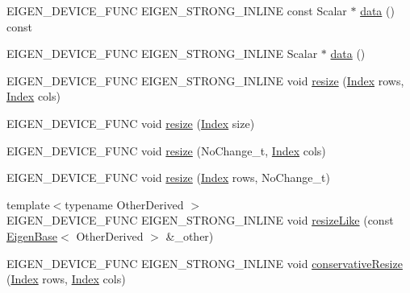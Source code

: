 \begin{DoxyCompactItemize}
\item 
E\+I\+G\+E\+N\+\_\+\+D\+E\+V\+I\+C\+E\+\_\+\+F\+U\+NC E\+I\+G\+E\+N\+\_\+\+S\+T\+R\+O\+N\+G\+\_\+\+I\+N\+L\+I\+NE const Scalar $\ast$ \hyperlink{class_eigen_1_1_plain_object_base_ac25699535374b1854cf8494e44ad31b2}{data} () const
\item 
E\+I\+G\+E\+N\+\_\+\+D\+E\+V\+I\+C\+E\+\_\+\+F\+U\+NC E\+I\+G\+E\+N\+\_\+\+S\+T\+R\+O\+N\+G\+\_\+\+I\+N\+L\+I\+NE Scalar $\ast$ \hyperlink{class_eigen_1_1_plain_object_base_a54ed64f45b2f5e852355d5e2311810bd}{data} ()
\item 
E\+I\+G\+E\+N\+\_\+\+D\+E\+V\+I\+C\+E\+\_\+\+F\+U\+NC E\+I\+G\+E\+N\+\_\+\+S\+T\+R\+O\+N\+G\+\_\+\+I\+N\+L\+I\+NE void \hyperlink{class_eigen_1_1_plain_object_base_a99d9054ee2d5a40c6e00ded0265e9cea}{resize} (\hyperlink{namespace_eigen_a62e77e0933482dafde8fe197d9a2cfde}{Index} rows, \hyperlink{namespace_eigen_a62e77e0933482dafde8fe197d9a2cfde}{Index} cols)
\item 
E\+I\+G\+E\+N\+\_\+\+D\+E\+V\+I\+C\+E\+\_\+\+F\+U\+NC void \hyperlink{class_eigen_1_1_plain_object_base_abf8a9ec07cd52a2cdabb527596f7ddd1}{resize} (\hyperlink{namespace_eigen_a62e77e0933482dafde8fe197d9a2cfde}{Index} size)
\item 
E\+I\+G\+E\+N\+\_\+\+D\+E\+V\+I\+C\+E\+\_\+\+F\+U\+NC void \hyperlink{class_eigen_1_1_plain_object_base_ab71a655f73d05a0e389e3ed13b6fe5f3}{resize} (No\+Change\+\_\+t, \hyperlink{namespace_eigen_a62e77e0933482dafde8fe197d9a2cfde}{Index} cols)
\item 
E\+I\+G\+E\+N\+\_\+\+D\+E\+V\+I\+C\+E\+\_\+\+F\+U\+NC void \hyperlink{class_eigen_1_1_plain_object_base_a7b44761b7350ae3756035bbf7d7c04f6}{resize} (\hyperlink{namespace_eigen_a62e77e0933482dafde8fe197d9a2cfde}{Index} rows, No\+Change\+\_\+t)
\item 
{\footnotesize template$<$typename Other\+Derived $>$ }\\E\+I\+G\+E\+N\+\_\+\+D\+E\+V\+I\+C\+E\+\_\+\+F\+U\+NC E\+I\+G\+E\+N\+\_\+\+S\+T\+R\+O\+N\+G\+\_\+\+I\+N\+L\+I\+NE void \hyperlink{class_eigen_1_1_plain_object_base_acc7200947e6399bee847ff37c8270fc8}{resize\+Like} (const \hyperlink{group___core___module_struct_eigen_1_1_eigen_base}{Eigen\+Base}$<$ Other\+Derived $>$ \&\+\_\+other)
\item 
E\+I\+G\+E\+N\+\_\+\+D\+E\+V\+I\+C\+E\+\_\+\+F\+U\+NC E\+I\+G\+E\+N\+\_\+\+S\+T\+R\+O\+N\+G\+\_\+\+I\+N\+L\+I\+NE void \hyperlink{class_eigen_1_1_plain_object_base_a5e06c62950ba98fe8ba9c7d4be9c19e4}{conservative\+Resize} (\hyperlink{namespace_eigen_a62e77e0933482dafde8fe197d9a2cfde}{Index} rows, \hyperlink{namespace_eigen_a62e77e0933482dafde8fe197d9a2cfde}{Index} cols)

\end{DoxyCompactItemize}
